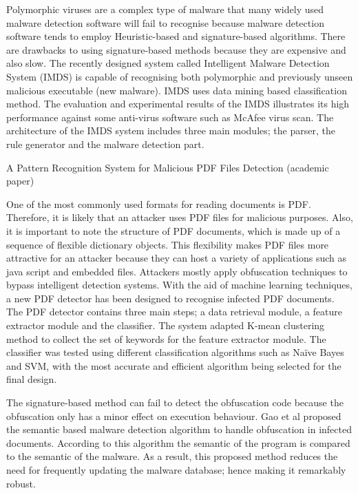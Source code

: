 Polymorphic viruses are a complex type of malware that many widely used malware detection software will fail to recognise because malware detection software tends to employ Heuristic-based and signature-based algorithms. There are drawbacks to using signature-based methods because they are expensive and also slow.  The recently designed system called Intelligent Malware Detection System (IMDS) is capable of recognising both polymorphic and previously unseen malicious executable (new malware). IMDS uses data mining based classification method. The evaluation and experimental results of the IMDS illustrates its high performance against some anti-virus software such as McAfee virus scan. The architecture of the IMDS system includes three main modules; the parser, the rule generator and the malware detection part. \cite{IMDS}

A Pattern Recognition System for Malicious PDF Files Detection (academic paper)

One of the most commonly used formats for reading documents is PDF. Therefore, it is likely that an attacker uses PDF files for malicious purposes. Also, it is important to note the structure of PDF documents, which is made up of a sequence of flexible dictionary objects. This flexibility makes PDF files more attractive for an attacker because they can host a variety of applications such as java script and embedded files. Attackers mostly apply obfuscation techniques to bypass intelligent detection systems. With the aid of machine learning techniques, a new PDF detector has been designed to recognise infected PDF documents.\cite{maiorca2012pattern}
The PDF detector contains three main steps; a data retrieval module, a feature extractor module and the classifier. The system adapted K-mean clustering method to collect the set of keywords for the feature extractor module. The classifier was tested using different classification algorithms such as Naïve Bayes and SVM, with the most accurate and efficient algorithm being selected for the final design.\cite{maiorca2012pattern}
 

The signature-based method can fail to detect the obfuscation code because the obfuscation only has a minor effect on execution behaviour. Gao et al proposed the semantic based malware detection algorithm to handle obfuscation in infected documents. According to this algorithm the semantic of the program is compared to the semantic of the malware. As a result, this proposed method reduces the need for frequently updating the malware database; hence making it remarkably robust.\cite{Amom} 


